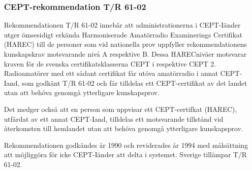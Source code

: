 \subsubsection{CEPT-rekommendation T/R 61-02}

Rekommendationen T/R 61-02 innebär att administrationerna i
CEPT-Iänder utger ömsesidigt erkända Harmoniserade Amatörradio
Examinerings Certifikat (HAREC) till de personer som vid nationella
prov uppfyller rekommendationens kunskapskrav motsvarande nivå A
respektive B. Dessa HARECnivåer motsvarar kraven för de svenska
certifikatsklasserna CEPT i respektive CEPT 2. Radioamatörer med ett
sådant certifikat får utöva amatörradio i annat CEPT-Iand, som godkänt
T/R 61-02 och får tilldelas ett CEPT-certifikat av det landet utan att
behöva genomgå ytterligare kunskapsprov.

Det medger också att en person som uppvisar ett CEPT-certifkat
(HAREC), utfärdat av ett annat CEPT-Iand, tilldelas ett motsvarande
tillstånd vid återkomsten till hemlandet utan att behöva genomgå
ytterligare kunskapsprov.

Rekommendationen godkändes år 1990 och reviderades år 1994 med
målsättning att möjliggöra för icke CEPT-Iänder att delta i systemet.
Sverige tillämpar T/R 61-02.


